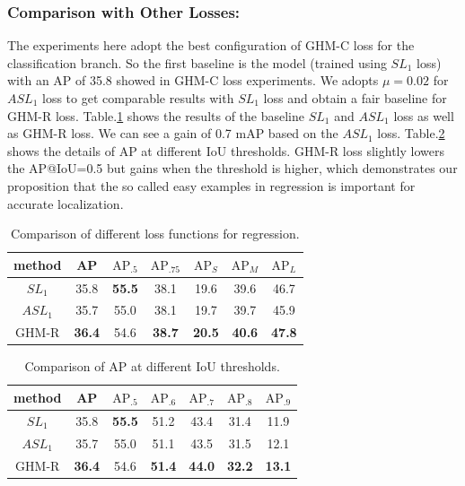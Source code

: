 \documentclass[letterpaper]{article} %
\begin{document}
\subsubsection{Comparison with Other Losses:} The experiments here adopt the best configuration of GHM-C loss for the classification branch. So the first baseline is the model (trained using $SL_1$ loss) with an AP of 35.8 showed in GHM-C loss experiments. We adopts $\mu=0.02$ for $ASL_1$ loss to get comparable results with $SL_1$ loss and obtain a fair baseline for GHM-R loss. Table.\ref{tab:reg1} shows the results of the baseline $SL_1$ and $ASL_1$ loss as well as  GHM-R loss. We can see a gain of 0.7 mAP based on the $ASL_1$ loss. Table.\ref{tab:regthr} shows the details of AP at different IoU thresholds.  GHM-R loss slightly lowers the AP@IoU=0.5 but gains when the threshold is higher, which demonstrates our proposition that the so called easy examples in regression is important for accurate localization.
\begin{table}[!ht]
\begin{center}
\begin{tabular}{| c | c  c  c  c  c  c |}
\hline
method & AP & $\text{AP}_{.5}$ & $\text{AP}_{.75}$ & $\text{AP}_{S}$ & $\text{AP}_{M}$ & $\text{AP}_{L}$ \\
\hline
$SL_1$ & 35.8 & \textbf{55.5} & 38.1 & 19.6 & 39.6 & 46.7 \\
$ASL_1$ & 35.7 & 55.0 & 38.1 & 19.7 & 39.7 & 45.9 \\
GHM-R & \textbf{36.4} & 54.6 & \textbf{38.7} & \textbf{20.5} & \textbf{40.6} & \textbf{47.8} \\
\hline 
\end{tabular}
\caption{Comparison of different loss functions for regression.}
\label{tab:reg1}
\end{center}
\end{table}

\begin{table}[!ht]
\begin{center}
\begin{tabular}{| c | c  c  c  c  c  c |}
\hline
method & AP & $\text{AP}_{.5}$ & $\text{AP}_{.6}$ & $\text{AP}_{.7}$ & $\text{AP}_{.8}$ & $\text{AP}_{.9}$ \\
\hline
$SL_1$ & 35.8 & \textbf{55.5} & 51.2 & 43.4 & 31.4 & 11.9 \\
$ASL_1$ & 35.7 & 55.0 & 51.1 & 43.5 & 31.5 & 12.1 \\
GHM-R & \textbf{36.4} & 54.6 & \textbf{51.4} & \textbf{44.0} & \textbf{32.2} & \textbf{13.1} \\
\hline
\end{tabular}
\caption{Comparison of AP at different IoU thresholds.}
\label{tab:regthr}
\end{center}
\end{table}
\end{document}
